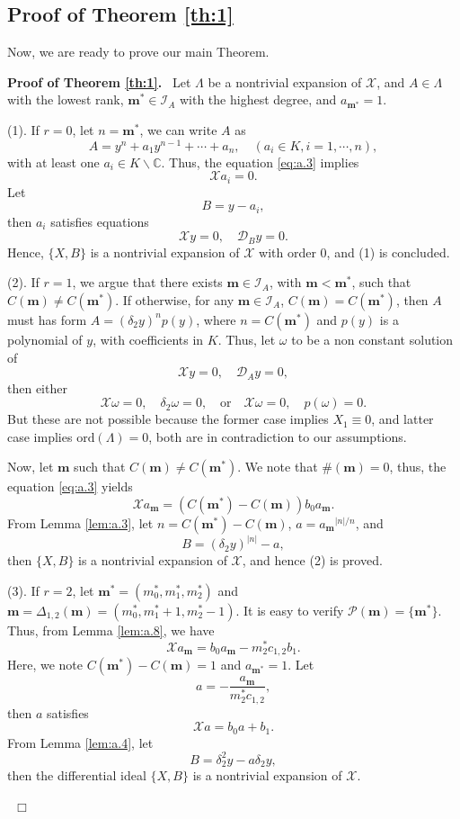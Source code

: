 \documentclass[preprint,12pt]{elsarticle}
\newenvironment{proof}[1][Proof]{\textbf{#1.}\ }{\ $\Box$}
\begin{document}
\subsection{Proof of Theorem \ref{th:1}}

Now, we are ready to prove our main Theorem.

\begin{proof}[Proof of Theorem \ref{th:1}]
Let $\Lambda$ be a nontrivial expansion of $\mathscr{X}$, and $A\in \Lambda$ with  the lowest rank, $\mathbf{m}^*\in \mathcal{I}_A$ with the highest degree, and $a_{\mathbf{m}^*} = 1$. 

(1).  If $r = 0$,  let $n = \mathbf{m}^*$,  we can write $A$ as
$$A = y^n + a_1 y^{n-1} + \cdots + a_n,\quad (a_i \in K,  i  = 1,\cdots, n),$$
with at least one $a_i\in K\backslash\mathbb{C}$. Thus, the equation \eqref{eq:a.3} implies
$$\mathscr{X}a_i = 0.$$
Let
$$B = y - a_i,$$
then $a_i$ satisfies equations
\begin{equation}
\mathscr{X}y = 0,\quad \mathscr{D}_{B}y = 0.
\end{equation}
Hence, $ \{X, B\}$ is a nontrivial expansion of $\mathscr{X}$ with  order $0$, and (1) is concluded. 

(2). If $r = 1$, we argue that there exists $\mathbf{m}\in \mathcal{I}_A$, with $\mathbf{m} < \mathbf{m}^*$, such that $C(\mathbf{m}) \not= C(\mathbf{m}^*)$. 
If otherwise, for any $\mathbf{m}\in \mathcal{I}_A$,  $C(\mathbf{m}) = C(\mathbf{m}^*)$, then $A$ must has form
$A = (\delta_2y)^{n}p(y)$, where $n = C(\mathbf{m}^*)$ and $p(y)$ is a polynomial of $y$, with coefficients in $K$.  Thus, let $\omega$ to be a non constant solution of 
$$\mathscr{X} y = 0,\quad \mathscr{D}_A y = 0,$$
then either
$$
\mathscr{X} \omega = 0,\quad \delta_2 \omega = 0,
\quad \mathrm{or}\quad \mathscr{X} \omega = 0,\quad p(\omega) = 0.
$$
But these are not possible because the former case implies $X_1\equiv 0$, and latter case implies  $\mathrm{ord}(\Lambda) = 0$, both are in contradiction to our assumptions. 

Now, let $\mathbf{m}$ such that $C(\mathbf{m}) \not = C(\mathbf{m}^*)$. We note that $\#(\mathbf{m}) = 0$, thus, the equation \eqref{eq:a.3} yields
$$\mathscr{X}a_{\mathbf{m}} = (C(\mathbf{m}^*) - C(\mathbf{m})) b_0 a_\mathbf{m}.$$
From Lemma \ref{lem:a.3},  let $n = C(\mathbf{m}^*) - C(\mathbf{m})$, $a = {a_{\mathbf{m}}}^{|n|/n}$, and
$$B = (\delta_2 y)^{|n|} - a,$$
then $\{X, B\}$ is a nontrivial expansion of $\mathscr{X}$, and hence (2) is proved.

(3). If $r = 2$, let $\mathbf{m}^* = (m_0^*, m_1^*,m_2^*)$  and $\mathbf{m} =
\Delta_{1,2}(\mathbf{m}) = (m_0^*, m_1^*+1,m_2^* - 1)$. It is easy to verify $\mathcal{P}(\mathbf{m}) =
\{\mathbf{m}^*\}$. Thus, from Lemma \ref{lem:a.8}, we have
$$\mathscr{X}a_{\mathbf{m}} = b_0 a_{\mathbf{m}} - m_2^* c_{1,2}  b_1.$$
Here, we note $C(\mathbf{m}^*) - C(\mathbf{m}) = 1$ and $a_{\mathbf{m}^*} = 1$. Let
$$a = -\dfrac{a_{\mathbf{m}}}{m_2^*  c_{1,2}},$$
then $a$ satisfies
$$\mathscr{X} a = b_0 a + b_1.$$
From Lemma \ref{lem:a.4}, let
$$B = \delta_2^2 y - a \delta_2 y,$$
then the differential ideal $\{X, B\}$ is a nontrivial expansion of $\mathscr{X}$.


\end{proof}
\end{document}
